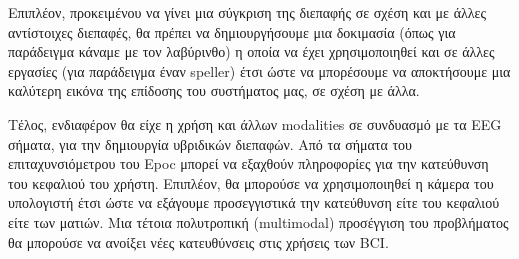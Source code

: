 \documentclass[11pt,a4paper,english,greek,twoside]{../Thesis}
\begin{document}
\par Επιπλέον, προκειμένου να γίνει μια σύγκριση της διεπαφής σε σχέση και με άλλες αντίστοιχες διεπαφές, θα πρέπει να δημιουργήσουμε μια δοκιμασία (όπως για παράδειγμα κάναμε με τον λαβύρινθο) η οποία να έχει χρησιμοποιηθεί και σε άλλες εργασίες (για παράδειγμα έναν speller) έτσι ώστε να μπορέσουμε να αποκτήσουμε μια καλύτερη εικόνα της επίδοσης του συστήματος μας, σε σχέση με άλλα. 

\par Τέλος, ενδιαφέρον θα είχε η χρήση και άλλων modalities σε συνδυασμό με τα EEG σήματα, για την δημιουργία υβριδικών διεπαφών. Από τα σήματα του επιταχυνσιόμετρου του Epoc μπορεί να εξαχθούν πληροφορίες για την κατεύθυνση του κεφαλιού του χρήστη. Επιπλέον, θα μπορούσε να χρησιμοποιηθεί η κάμερα του υπολογιστή έτσι ώστε να εξάγουμε προσεγγιστικά την κατεύθυνση είτε του κεφαλιού είτε των ματιών. Μια τέτοια πολυτροπική (multimodal) προσέγγιση του προβλήματος θα μπορούσε να ανοίξει νέες κατευθύνσεις στις χρήσεις των BCI.
\end{document}
